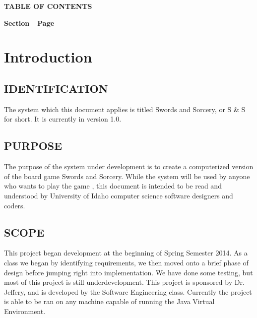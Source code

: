 \documentclass[twoside,letterpaper,pdftex]{article}
\begin{document}
{\centering{}\bfseries\color{black}
TABLE OF CONTENTS
\par}


\bigskip

{\bfseries\color{black}
Section\ \ Page}

\setcounter{tocdepth}{9}
\renewcommand\contentsname{}
\tableofcontents

\bigskip

\clearpage\clearpage\setcounter{page}{1}\pagestyle{Convertii}
\section[Introduction]{\rmfamily\bfseries Introduction}
\hypertarget{RefHeading15659017292}{}{
{\textit{
}}}

\subsection[IDENTIFICATION]{\rmfamily\bfseries IDENTIFICATION}
\hypertarget{RefHeading15859017292}{}{\itshape
}

{
The system which this document applies is titled Swords and Sorcery, or S \& S for short. It is currently in version 1.0.}

\subsection[PURPOSE]{\rmfamily\bfseries PURPOSE}
\hypertarget{RefHeading16059017292}{}{\itshape
}

{
The purpose of the system under development is to
create a computerized version of the board game Swords and Sorcery. 
While the system will be used by anyone who wants to play the game
, this document is intended to be read and understood
by University of Idaho computer science software designers and coders.}

\subsection[SCOPE]{\rmfamily\bfseries SCOPE}
\hypertarget{RefHeading16259017292}{}{\itshape
}

{
This project began development at the beginning of Spring Semester 2014. As a class
we began by identifying requirements, we then moved onto a brief phase of design before
jumping right into implementation. We have done some testing, but most of this project
is still underdevelopment. This project is sponsored by Dr. Jeffery, and is developed by
the Software Engineering class. Currently the project is able to be ran on any machine
capable of running the Java Virtual Environment.}
\end{document}
